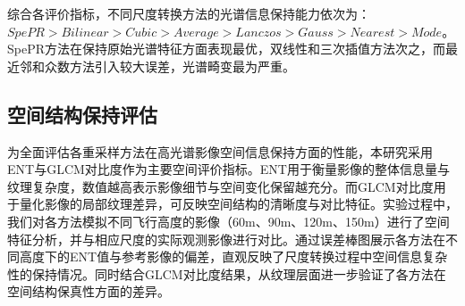 综合各评价指标，不同尺度转换方法的光谱信息保持能力依次为：$SpePR>Bilinear>Cubic>Average>Lanczos>Gauss>Nearest>Mode$。SpePR方法在保持原始光谱特征方面表现最优，双线性和三次插值方法次之，而最近邻和众数方法引入较大误差，光谱畸变最为严重。
\subsection{空间结构保持评估}
为全面评估各重采样方法在高光谱影像空间信息保持方面的性能，本研究采用ENT与GLCM对比度作为主要空间评价指标。ENT用于衡量影像的整体信息量与纹理复杂度，数值越高表示影像细节与空间变化保留越充分。而GLCM对比度用于量化影像的局部纹理差异，可反映空间结构的清晰度与对比特征。实验过程中，我们对各方法模拟不同飞行高度的影像（60m、90m、120m、150m）进行了空间特征分析，并与相应尺度的实际观测影像进行对比。通过误差棒图展示各方法在不同高度下的ENT值与参考影像的偏差，直观反映了尺度转换过程中空间信息复杂性的保持情况。同时结合GLCM对比度结果，从纹理层面进一步验证了各方法在空间结构保真性方面的差异。

